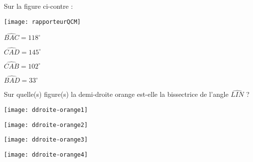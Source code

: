 \begin{QCM}
\begin{GroupeQCM}
    
     \begin{exercice}
     Sur la figure ci-contre : \vspace{-2em}\begin{center}\texttt{[image: rapporteurQCM]}\end{center}\vspace{-1em}
      \begin{ChoixQCM}{4}
      \item $\widehat{BAC} = 118^\circ$
      \item $\widehat{CAD} = 145^\circ$
      \item $\widehat{CAB} = 102^\circ$
      \item $\widehat{BAD} = 33^\circ$
      \end{ChoixQCM}
\begin{corrige}
   \end{corrige}
    \end{exercice}
    
    
    \begin{exercice}
     Sur quelle(s) figure(s) la demi-droite orange est-elle la bissectrice de l'angle $\widehat{LIN}$ ?
      \begin{ChoixQCM}{4}
      \item \texttt{[image: ddroite-orange1]}
      \item \texttt{[image: ddroite-orange2]}
      \item \texttt{[image: ddroite-orange3]}
      \item \texttt{[image: ddroite-orange4]}
      \end{ChoixQCM}
\begin{corrige}
   \end{corrige}
    \end{exercice}
\end{GroupeQCM}
\end{QCM}

  